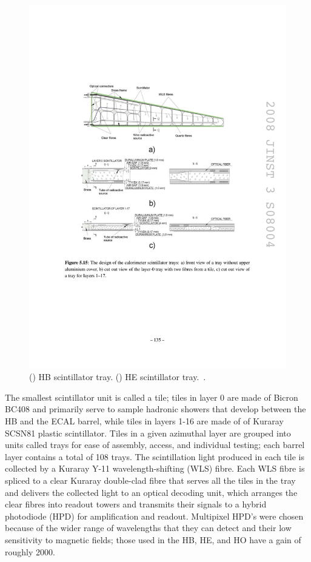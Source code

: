 \begin{figure}[hbtp]
\begin{center}
    \includegraphics[width=\cmsFigWidth]{figures/cms-hcal-HEtray}
    \caption{(\cmsLeft) HB scintillator tray. (\cmsRight) HE scintillator tray.~\cite{1748-0221-3-08-S08004}.}
    \label{fig:cms-hcal-numbertray}
  \end{center}
\end{figure}

The smallest scintillator unit is called a tile; tiles in layer 0 are made of Bicron BC408 and primarily serve to sample hadronic showers that develop between the HB and the ECAL barrel, while tiles in layers 1-16 are made of of Kuraray SCSN81 plastic scintillator. Tiles in a given azimuthal layer are grouped into units called trays for ease of assembly, access, and individual testing; each barrel layer contains a total of 108 trays. The scintillation light produced in each tile is collected by a Kuraray Y-11 wavelength-shifting (WLS) fibre. Each WLS fibre is spliced to a clear Kuraray double-clad fibre that serves all the tiles in the tray and delivers the collected light to an optical decoding unit, which arranges the clear fibres into readout towers and transmits their signals to a hybrid photodiode (HPD) for amplification and readout. Multipixel HPD's were chosen because of the wider range of wavelengths that they can detect and their low sensitivity to magnetic fields; those used in the HB, HE, and HO have a gain of roughly 2000.

